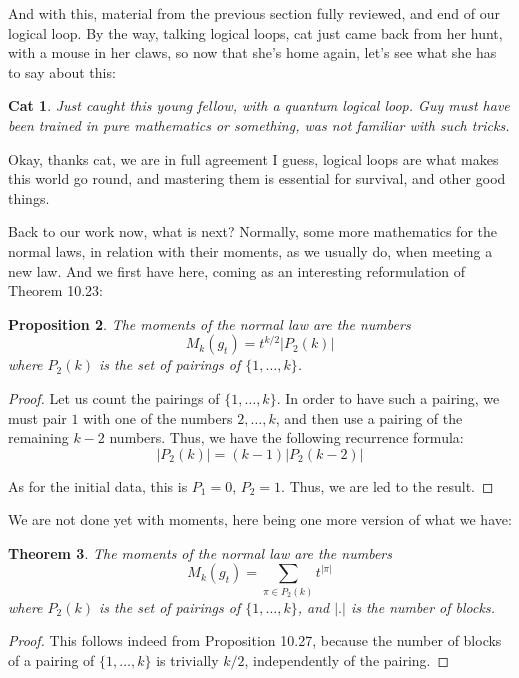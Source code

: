 \documentclass[12pt]{amsbook}
\newtheorem{theorem}{Theorem}[chapter]
\newtheorem{cat}[theorem]{Cat}
\newtheorem{proposition}[theorem]{Proposition}
\begin{document}
And with this, material from the previous section fully reviewed, and end of our logical loop. By the way, talking logical loops, cat just came back from her hunt, with a mouse in her claws, so now that she's home again, let's see what she has to say about this:

\begin{cat}
Just caught this young fellow, with a quantum logical loop. Guy must have been trained in pure mathematics or something, was not familiar with such tricks.
\end{cat}

Okay, thanks cat, we are in full agreement I guess, logical loops are what makes this world go round, and mastering them is essential for survival, and other good things.

\bigskip

Back to our work now, what is next? Normally, some more mathematics for the normal laws, in relation with their moments, as we usually do, when meeting a new law. And we first have here, coming as an interesting reformulation of Theorem 10.23:

\begin{proposition}
The moments of the normal law are the numbers
$$M_k(g_t)=t^{k/2}|P_2(k)|$$
where $P_2(k)$ is the set of pairings of $\{1,\ldots,k\}$.
\end{proposition}

\begin{proof}
Let us count the pairings of $\{1,\ldots,k\}$. In order to have such a pairing, we must pair $1$ with one of the numbers $2,\ldots,k$, and then use a pairing of the remaining $k-2$ numbers. Thus, we have the following recurrence formula:
$$|P_2(k)|=(k-1)|P_2(k-2)|$$

As for the initial data, this is $P_1=0$, $P_2=1$. Thus, we are led to the result.
\end{proof}

We are not done yet with moments, here being one more version of what we have:

\begin{theorem}
The moments of the normal law are the numbers
$$M_k(g_t)=\sum_{\pi\in P_2(k)}t^{|\pi|}$$
where $P_2(k)$ is the set of pairings of $\{1,\ldots,k\}$, and $|.|$ is the number of blocks.
\end{theorem}

\begin{proof}
This follows indeed from Proposition 10.27, because the number of blocks of a pairing of $\{1,\ldots,k\}$ is trivially $k/2$, independently of the pairing.
\end{proof}
\end{document}
